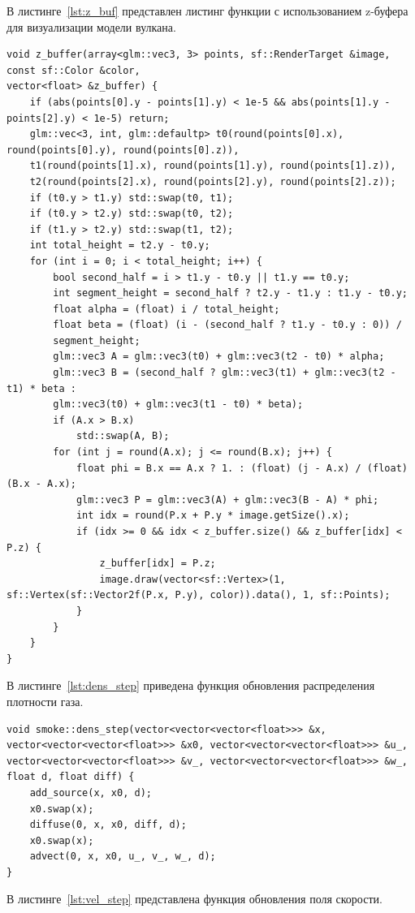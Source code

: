 В листинге~\ref{lst:z_buf} представлен листинг функции с использованием z-буфера для визуализации модели вулкана.
\clearpage 
\begin{lstlisting}[caption={Функция использующая z-буфер для визуализации треугольника},label={lst:z_buf}]
void z_buffer(array<glm::vec3, 3> points, sf::RenderTarget &image, const sf::Color &color,
vector<float> &z_buffer) {
	if (abs(points[0].y - points[1].y) < 1e-5 && abs(points[1].y - points[2].y) < 1e-5) return;
	glm::vec<3, int, glm::defaultp> t0(round(points[0].x), round(points[0].y), round(points[0].z)),
	t1(round(points[1].x), round(points[1].y), round(points[1].z)),
	t2(round(points[2].x), round(points[2].y), round(points[2].z));
	if (t0.y > t1.y) std::swap(t0, t1);
	if (t0.y > t2.y) std::swap(t0, t2);
	if (t1.y > t2.y) std::swap(t1, t2);
	int total_height = t2.y - t0.y;
	for (int i = 0; i < total_height; i++) {
		bool second_half = i > t1.y - t0.y || t1.y == t0.y;
		int segment_height = second_half ? t2.y - t1.y : t1.y - t0.y;
		float alpha = (float) i / total_height;
		float beta = (float) (i - (second_half ? t1.y - t0.y : 0)) /
		segment_height;
		glm::vec3 A = glm::vec3(t0) + glm::vec3(t2 - t0) * alpha;
		glm::vec3 B = (second_half ? glm::vec3(t1) + glm::vec3(t2 - t1) * beta :
		glm::vec3(t0) + glm::vec3(t1 - t0) * beta);
		if (A.x > B.x) 
			std::swap(A, B);
		for (int j = round(A.x); j <= round(B.x); j++) {
			float phi = B.x == A.x ? 1. : (float) (j - A.x) / (float) (B.x - A.x);
			glm::vec3 P = glm::vec3(A) + glm::vec3(B - A) * phi;
			int idx = round(P.x + P.y * image.getSize().x);
			if (idx >= 0 && idx < z_buffer.size() && z_buffer[idx] < P.z) {
				z_buffer[idx] = P.z;
				image.draw(vector<sf::Vertex>(1, sf::Vertex(sf::Vector2f(P.x, P.y), color)).data(), 1, sf::Points);
			}
		}
	}
}
\end{lstlisting}

В листинге~\ref{lst:dens_step} приведена функция обновления распределения плотности газа.
\begin{lstlisting}[caption={Функция обновления распределения плотности дыма},label={lst:dens_step}]
void smoke::dens_step(vector<vector<vector<float>>> &x, vector<vector<vector<float>>> &x0, vector<vector<vector<float>>> &u_,
vector<vector<vector<float>>> &v_, vector<vector<vector<float>>> &w_, float d, float diff) {
	add_source(x, x0, d);
	x0.swap(x);
	diffuse(0, x, x0, diff, d);
	x0.swap(x);
	advect(0, x, x0, u_, v_, w_, d);
}
\end{lstlisting}

В листинге~\ref{lst:vel_step} представлена функция обновления поля скорости.

